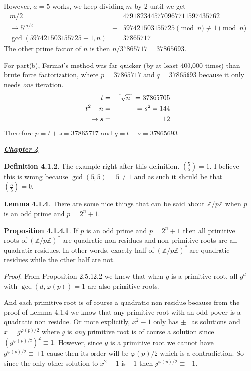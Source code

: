 \documentclass[aps,preprint,preprintnumbers,nofootinbib,showpacs,prd]{revtex4-1}
\newcommand{\nbea}{\begin{eqnarray*}}
\newcommand{\neea}{\end{eqnarray*}}
\DeclarePairedDelimiter{\ceil}{\lceil}{\rceil}
\begin{document}
However, $a=5$ works, we keep dividing $m$ by 2 until we get
%
\nbea
m/2 & = & 4791823445770967711597435762 \\
\to 5^{m/2} & \equiv & 597421503155725 \pmod{n} \not\equiv 1 \pmod{n} \\
\gcd(597421503155725 - 1, n) & = & 37865717
\neea
%
The other prime factor of $n$ is then $n / 37865717 = 37865693$.

For part(b), Fermat's method was far quicker (by at least 400,000 times) than brute force factorization, where $p = 37865717$ and $q = 37865693$ because it only needs {\it one} iteration.
%
\nbea
t & = & \ceil{\sqrt{n}} = 37865705 \\
t^2 - n & = & = s^2 = 144 \\
\to s & = & 12
\neea
%
Therefore $p = t + s = 37865717$ and $q = t - s = 37865693$.

\bigskip
\underline{\textbf{\textit{Chapter 4}}}
\bigskip

{\bf Definition 4.1.2}. The example right after this definition. $\left ( \frac{5}{5}\right ) = 1$. I believe this is wrong because $\gcd(5,5) = 5 \neq 1$ and as such it should be that $\left ( \frac{5}{5}\right ) = 0$.

{\bf Lemma 4.1.4}. There are some nice things that can be said about $\mathbb{Z}/p\mathbb{Z}$  when $p$ is an odd prime and $p = 2^n + 1$.

{\bf Proposition 4.1.4.1}. If $p$ is an odd prime and $p = 2^n + 1$ then all primitive roots of $(\mathbb{Z}/p\mathbb{Z})^*$ are quadratic non residues and non-primitive roots are all quadratic residues. In other words, exactly half of $(\mathbb{Z}/p\mathbb{Z})^*$ are quadratic residues while the other half are not.

{\it Proof}. From Proposition 2.5.12.2 we know that when $g$ is a primitive root, all $g^d$ with $\gcd(d, \varphi(p)) = 1$ are also primitive roots.

And each primitive root is of course a quadratic non residue because from the proof of Lemma 4.1.4 we know that any primitive root with an odd power is a quadratic non residue. Or more explicitly, $x^2 - 1$ only has $\pm1$ as solutions and $x=g^{\varphi(p)/2}$ where $g$ is {\it any} primitive root is of course a solution since $(g^{\varphi(p)/2})^2 \equiv 1$. However, since $g$ is a primitive root we cannot have $g^{\varphi(p)/2} \equiv +1$ cause then its order will be $\varphi(p)/2$ which is a contradiction. So since the only other solution to $x^2-1$ is $-1$ then $g^{\varphi(p)/2} \equiv -1$.
\end{document}
